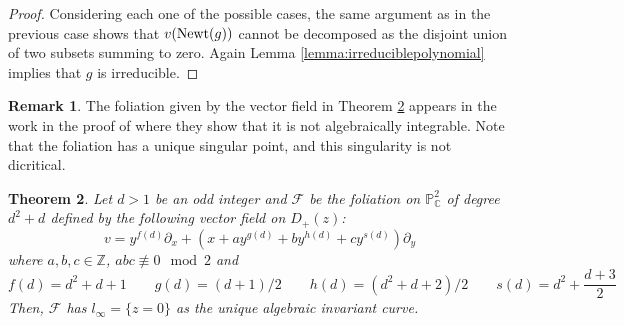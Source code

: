 \documentclass[reqno,oneside,11pt]{amsart}
\newtheorem{thm}{Theorem}[section]
\theoremstyle{definition}
\newtheorem{OBS}[thm]{Remark}
\begin{document}
\begin{proof}

Considering each one of the possible cases, the same argument as in the previous case shows that $v({\rm Newt}(g))$ cannot be decomposed as the disjoint union of two subsets summing to zero. Again Lemma \ref{lemma:irreduciblepolynomial} implies that $g$ is irreducible.
\end{proof}

\begin{OBS}\label{claudia2} The foliation given by the vector field in Theorem \ref{claudia} appears in the work \cite{alcantara2020foliations} in the proof of \cite[Theorem 2]{alcantara2020foliations} where they
show that it is not algebraically integrable. Note that the foliation has a unique singular point, and this singularity is not dicritical.
\end{OBS}

\begin{thm}\label{claudia} Let $d>1$ be an odd integer and $\mathcal{F}$ be the foliation on $\mathbb{P}_{\mathbb{C}}^{2}$ of degree $d^2+d$ defined by the following vector field on $D_{+}(z)$:  
    $$
        v = y^{f(d)}\partial_x+(x+ay^{g(d)}+by^{h(d)}+cy^{s(d)})\partial_y
    $$      
where $a,b,c \in \mathbb{Z}$, $abc \not\equiv 0 \mod 2$ and
$$f(d) = d^2+d+1 \qquad g(d) = (d+1)/2 \qquad h(d) = (d^2+d+2)/2 \qquad s(d) = d^2+\frac{d+3}{2}$$
Then, $\mathcal{F}$ has $l_{\infty} = \{z = 0\}$ as the unique algebraic invariant curve.
\end{thm}
\end{document}

